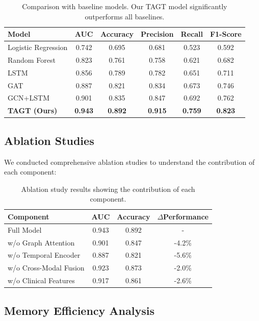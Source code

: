 \documentclass[10pt,twocolumn]{article}
\begin{document}
\begin{table}[h]
\centering
\begin{tabular}{lccccc}
\toprule
Model & AUC & Accuracy & Precision & Recall & F1-Score \\
\midrule
Logistic Regression & 0.742 & 0.695 & 0.681 & 0.523 & 0.592 \\
Random Forest & 0.823 & 0.761 & 0.758 & 0.621 & 0.682 \\
LSTM & 0.856 & 0.789 & 0.782 & 0.651 & 0.711 \\
GAT & 0.887 & 0.821 & 0.834 & 0.673 & 0.746 \\
GCN+LSTM & 0.901 & 0.835 & 0.847 & 0.692 & 0.762 \\
\textbf{TAGT (Ours)} & \textbf{0.943} & \textbf{0.892} & \textbf{0.915} & \textbf{0.759} & \textbf{0.823} \\
\bottomrule
\end{tabular}
\caption{Comparison with baseline models. Our TAGT model significantly outperforms all baselines.}
\label{tab:baselines}
\end{table}

\subsection{Ablation Studies}

We conducted comprehensive ablation studies to understand the contribution of each component:

\begin{table}[h]
\centering
\begin{tabular}{lccc}
\toprule
Component & AUC & Accuracy & $\Delta$Performance \\
\midrule
Full Model & 0.943 & 0.892 & - \\
w/o Graph Attention & 0.901 & 0.847 & -4.2\% \\
w/o Temporal Encoder & 0.887 & 0.821 & -5.6\% \\
w/o Cross-Modal Fusion & 0.923 & 0.873 & -2.0\% \\
w/o Clinical Features & 0.917 & 0.861 & -2.6\% \\
\bottomrule
\end{tabular}
\caption{Ablation study results showing the contribution of each component.}
\label{tab:ablation}
\end{table}

\subsection{Memory Efficiency Analysis}
\end{document}
